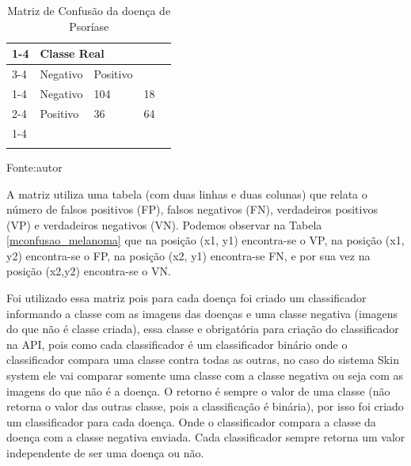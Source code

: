 \documentclass[openright]{ifrs} %
\begin{document}
\begin{table}[h]
\centering
\caption{Matriz de Confusão da doença de Psoríase}

\label{mconfusao_psoriase}

\begin{tabular}{lllll}
\cline{1-4}
\multicolumn{2}{|l|}{\multirow{2}{*}{}}                                                & \multicolumn{2}{l|}{Classe Real}                              &  \\ \cline{3-4}
\multicolumn{2}{|l|}{}                                                                 & \multicolumn{1}{l|}{Negativo} & \multicolumn{1}{l|}{Positivo} &  \\ \cline{1-4}
\multicolumn{1}{|l|}{\multirow{2}{*}{Classe Prevista}} & \multicolumn{1}{l|}{Negativo} & \multicolumn{1}{l|}{104}        & \multicolumn{1}{l|}{18}        &  \\ \cline{2-4}
\multicolumn{1}{|l|}{}                                 & \multicolumn{1}{l|}{Positivo} & \multicolumn{1}{l|}{36}        & \multicolumn{1}{l|}{64}        &  \\ \cline{1-4}
                                                       &                               &                               &                               &  \\
                                                       &                               &                               &                               & 
\end{tabular}
\centerline{Fonte:autor}
\end{table}



A matriz utiliza  uma tabela (com duas linhas e duas colunas) que relata o número de falsos positivos (FP), falsos negativos (FN),  verdadeiros positivos (VP) e verdadeiros negativos (VN). Podemos observar na Tabela \ref{mconfusao_melanoma} que na posição (x1, y1) encontra-se o VP,  na posição (x1, y2) encontra-se o FP, na posição (x2, y1) encontra-se FN, e por sua vez na posição (x2,y2) encontra-se o VN.

Foi utilizado essa matriz pois para cada  doença foi criado um classificador informando a classe com  as imagens das doenças e uma classe negativa (imagens do que não é classe criada), essa classe e obrigatória para criação do classificador na API, pois como cada classificador é um classificador binário onde o classificador compara uma classe contra todas as outras, no caso do sistema Skin system ele vai comparar somente uma classe com a classe negativa ou seja com as imagens do que não é a doença. O retorno é sempre o valor de uma classe (não  retorna o valor das outras classe, pois a classificação é binária), por isso foi criado um classificador para cada doença. Onde o classificador compara a classe da doença com a classe negativa enviada. Cada classificador sempre retorna um valor independente de ser uma doença ou não.
\end{document}
